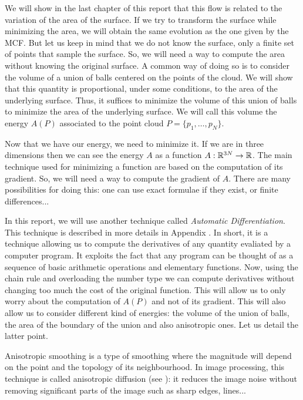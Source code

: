 We will show in the last chapter of this report that this flow is related to the
variation of the area of the surface. If we try to transform the surface while
minimizing the area, we will obtain the same evolution as the one given by the
MCF. But let us keep in mind that we do not know the surface, only a finite set
of points that sample the surface. So, we will need a way to compute the area
without knowing the original surface. A common way of doing so is to consider
the volume of a union of balls centered on the points of the cloud.  We will
show that this quantity is proportional, under some conditions, to the area of
the underlying surface. Thus, it suffices to minimize the volume of this union
of balls to minimize the area of the underlying surface. We will call this
volume the energy $ A(P) $ associated to the point cloud $ P = \{ p_1, \ldots,
p_N \} $.

Now that we have our energy, we need to minimize it. If we are in three
dimensions then we can see the energy $ A $ as a function $ A : \mathbb{R}^{3N} \to \mathbb{R}
$. The main technique used for minimizing a function are based on the
computation of its gradient. So, we will need a way to compute the gradient of $
A $. There are many possibilities for doing this: one can use exact formulae if
they exist, or finite differences...

In this report, we will use another technique called \textit{Automatic
    Differentiation}. This technique is described in more details in Appendix
. In short, it is a technique allowing us to compute
the derivatives of any quantity evaliated by a computer program. It exploits the
fact that any program can be thought of as a sequence of basic arithmetic
operations and elementary functions. Now, using the chain rule and overloading
the number type we can compute derivatives without changing too much the cost of
the original function.  This will allow us to only worry about the computation
of $ A(P) $ and not of its gradient. This will also allow us to consider
different kind of energies: the volume of the union of balls, the area of the
boundary of the union and also anisotropic ones. Let us detail the latter point.

Anisotropic smoothing is a type of smoothing where the magnitude will depend on
the point and the topology of its neighbourhood. In image processing, this
technique is called anisotropic diffusion (see \cite{weickert1998anisotropic}):
it reduces the image noise without removing significant parts of the image such
as sharp edges, lines...

